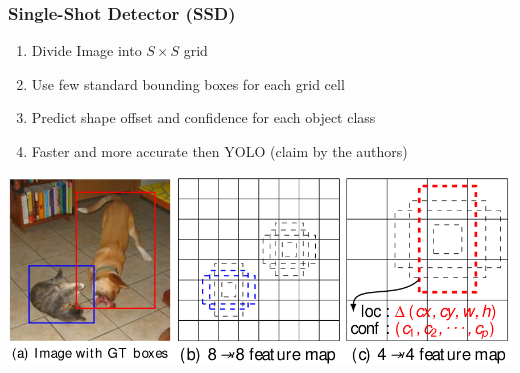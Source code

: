 \subsubsection{Single-Shot Detector (SSD)}
\begin{minipage}{0.5\textwidth}
    \begin{enumerate}
        \item Divide Image into $S\times S$ grid
        \item Use few standard bounding boxes for each grid cell
        \item Predict shape offset and confidence for each object class
        \item Faster and more accurate then YOLO (claim by the authors)
    \end{enumerate}
\end{minipage}
\begin{minipage}{0.5\textwidth}
    \includegraphics[width=1\textwidth]{sections/FindingMultipleObjects/img/ssd.png}
\end{minipage}

